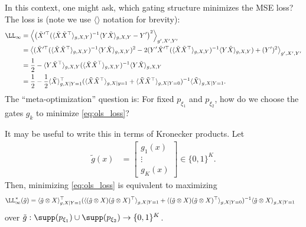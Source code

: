 \documentclass{article}
\begin{document}
In this context, one might ask, which gating structure minimizes the MSE loss?
The loss is (note we use $\langle \rangle$ notation for brevity):
\begin{align}
  \LL_{\infty}
  &= \left\langle \left( \tilde{X}'^\top (\langle \tilde{X} \tilde{X}^\top \rangle_{g,X,Y})^{-1} \langle Y \tilde{X} \rangle_{g,X,Y} - Y' \right)^2 \right\rangle_{g',X',Y'}  \\
  &= \left\langle ( \tilde{X}'^\top (\langle \tilde{X} \tilde{X}^\top \rangle_{g,X,Y})^{-1} \langle Y \tilde{X} \rangle_{g,X,Y} )^2 - 2 ( Y' \tilde{X}'^\top (\langle \tilde{X} \tilde{X}^\top \rangle_{g,X,Y})^{-1} \langle Y \tilde{X} \rangle_{g,X,Y} ) + (Y')^2 \right\rangle_{g',X',Y'} \\
  &= \frac{1}{2} - \langle Y \tilde{X}^\top \rangle_{g,X,Y} (\langle \tilde{X} \tilde{X}^\top \rangle_{g,X,Y})^{-1} \langle Y \tilde{X} \rangle_{g,X,Y} \\
  &= \frac{1}{2} - \frac{1}{2} \langle \tilde{X} \rangle_{g, X \mid Y=1}^\top (\langle \tilde{X} \tilde{X}^\top \rangle_{g, X \mid y=1} + \langle \tilde{X} \tilde{X}^\top \rangle_{g, X \mid Y=0})^{-1} \langle \tilde{X} \rangle_{g, X \mid Y=1}. \label{eq:ols_loss}
\end{align}
The ``meta-optimization'' question is: For fixed $p_{\xi_1}$ and $p_{\xi_2}$, how do we choose the gates $g_k$ to minimize \cref{eq:ols_loss}?

It may be useful to write this in terms of Kronecker products.
Let
\begin{align}
  \tilde{g}(x) &= \begin{bmatrix} g_1(x) \\ \vdots \\ g_K(x) \end{bmatrix} \in \{ 0,1 \}^K.
\end{align}
Then, minimizing \cref{eq:ols_loss} is equivalent to maximizing
\begin{align}
  \LL_{\infty}^*(\tilde{g}) &= \langle \tilde{g} \otimes X \rangle_{g, X \mid Y=1}^\top (\langle ( \tilde{g} \otimes X ) ( \tilde{g} \otimes X )^\top \rangle_{g, X \mid Y=1} + \langle ( \tilde{g} \otimes X ) ( \tilde{g} \otimes X )^\top \rangle_{g, X \mid Y=0})^{-1} \langle \tilde{g} \otimes X \rangle_{g, X \mid Y=1} \label{eq:ols_kron}
\end{align}
over $\tilde{g} : \supp(p_{\xi_1}) \cup \supp(p_{\xi_2}) \to \{0,1\}^K$.
\end{document}

